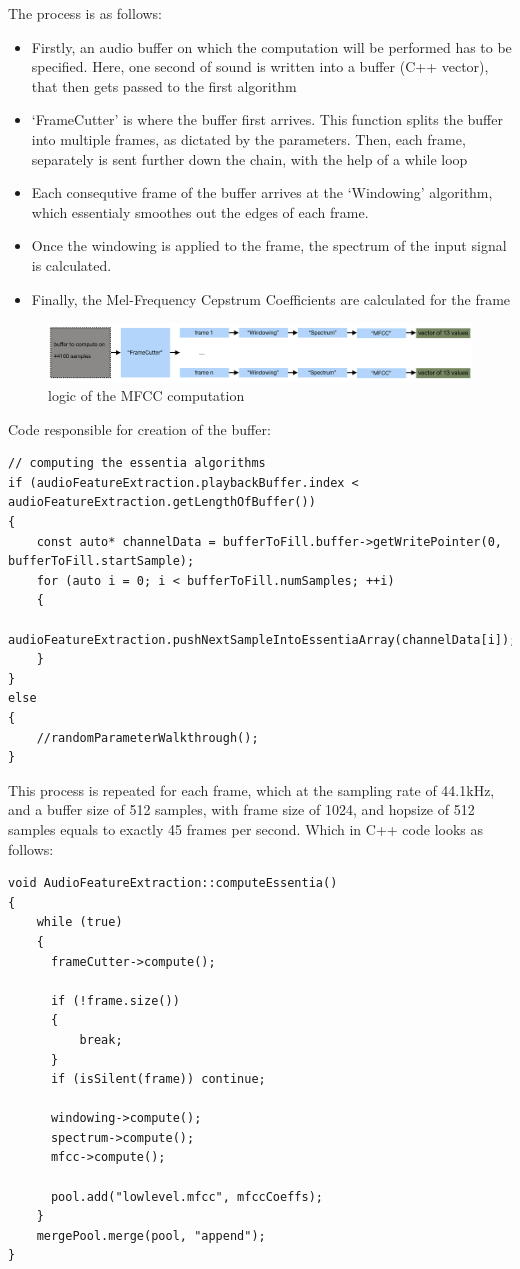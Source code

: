 
The process is as follows:

\begin{itemize}
\item Firstly, an audio buffer on which the computation will be
  performed has to be specified. Here, one second of sound is written
  into a buffer (C++ vector), that then gets passed to the first algorithm
\item `FrameCutter' is where the buffer first arrives. This function
  splits the buffer into multiple frames, as dictated by the
  parameters. Then, each frame, separately is sent further down the
  chain, with the help of a while loop
\item Each consequtive frame of the buffer arrives at the `Windowing'
  algorithm, which essentialy smoothes out the edges of each frame.
\item Once the windowing is applied to the frame, the spectrum of the
  input signal is calculated.
\item Finally, the Mel-Frequency Cepstrum Coefficients are calculated
  for the frame
\end{itemize}

\begin{figure}[h]
\caption{logic of the MFCC computation}
\centering
\includegraphics[width=1\textwidth]{images/essentia_logic}
\end{figure}

\vskip 1cm

Code responsible for creation of the buffer:
\begin{lstlisting}
// computing the essentia algorithms
if (audioFeatureExtraction.playbackBuffer.index < audioFeatureExtraction.getLengthOfBuffer())
{
    const auto* channelData = bufferToFill.buffer->getWritePointer(0, bufferToFill.startSample);
    for (auto i = 0; i < bufferToFill.numSamples; ++i)
    {
        audioFeatureExtraction.pushNextSampleIntoEssentiaArray(channelData[i]);
    }
}
else
{
    //randomParameterWalkthrough();
}
\end{lstlisting}


This process is repeated for each frame, which at the sampling rate of
44.1kHz, and a buffer size of 512 samples, with frame size of 1024,
and hopsize of 512 samples equals to exactly 45 frames per
second. Which in C++ code looks as follows:
\begin{lstlisting}
void AudioFeatureExtraction::computeEssentia()
{
    while (true)
    {
      frameCutter->compute();

      if (!frame.size())
      {
          break;
      }
      if (isSilent(frame)) continue;
        
      windowing->compute();
      spectrum->compute();
      mfcc->compute();
      
      pool.add("lowlevel.mfcc", mfccCoeffs);
    }
    mergePool.merge(pool, "append");
}
\end{lstlisting}

